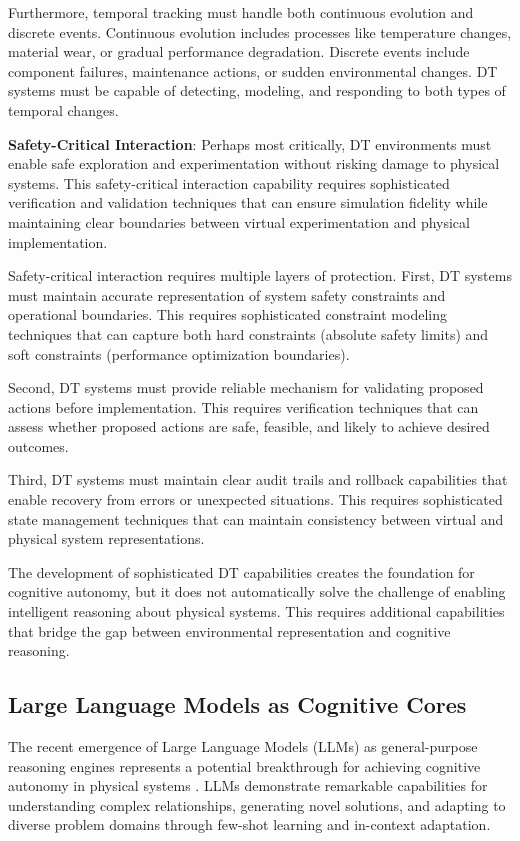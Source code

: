 Furthermore, temporal tracking must handle both continuous evolution and discrete events. Continuous evolution includes processes like temperature changes, material wear, or gradual performance degradation. Discrete events include component failures, maintenance actions, or sudden environmental changes. DT systems must be capable of detecting, modeling, and responding to both types of temporal changes.

\textbf{Safety-Critical Interaction}: Perhaps most critically, DT environments must enable safe exploration and experimentation without risking damage to physical systems. This safety-critical interaction capability requires sophisticated verification and validation techniques that can ensure simulation fidelity while maintaining clear boundaries between virtual experimentation and physical implementation.

Safety-critical interaction requires multiple layers of protection. First, DT systems must maintain accurate representation of system safety constraints and operational boundaries. This requires sophisticated constraint modeling techniques that can capture both hard constraints (absolute safety limits) and soft constraints (performance optimization boundaries).

Second, DT systems must provide reliable mechanism for validating proposed actions before implementation. This requires verification techniques that can assess whether proposed actions are safe, feasible, and likely to achieve desired outcomes.

Third, DT systems must maintain clear audit trails and rollback capabilities that enable recovery from errors or unexpected situations. This requires sophisticated state management techniques that can maintain consistency between virtual and physical system representations.

The development of sophisticated DT capabilities creates the foundation for cognitive autonomy, but it does not automatically solve the challenge of enabling intelligent reasoning about physical systems. This requires additional capabilities that bridge the gap between environmental representation and cognitive reasoning.

\subsection{Large Language Models as Cognitive Cores}

The recent emergence of Large Language Models (LLMs) as general-purpose reasoning engines represents a potential breakthrough for achieving cognitive autonomy in physical systems \cite{brown2020language, chowdhery2022palm}. LLMs demonstrate remarkable capabilities for understanding complex relationships, generating novel solutions, and adapting to diverse problem domains through few-shot learning and in-context adaptation.

